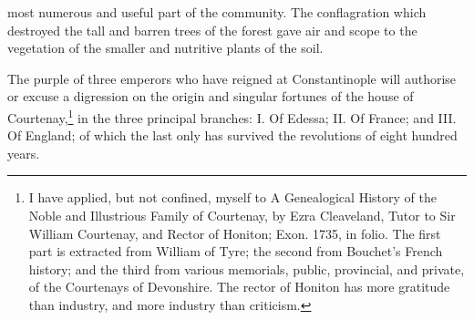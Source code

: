 most numerous and useful part of the community. The conflagration which destroyed the tall and barren trees of the forest gave air and scope to the vegetation of the smaller and nutritive plants of the soil.


The purple of three emperors who have reigned at Constantinople will authorise or excuse a digression on the origin and singular fortunes of the house of Courtenay,\footnote{I have applied, but not confined, myself to A Genealogical History of the Noble and Illustrious Family of Courtenay, by Ezra Cleaveland, Tutor to Sir William Courtenay, and Rector of Honiton; Exon. 1735, in folio. The first part is extracted from William of Tyre; the second from Bouchet\texthebrew{}’s French history; and the third from various memorials, public, provincial, and private, of the Courtenays of Devonshire. The rector of Honiton has more gratitude than industry, and more industry than criticism.} in the three principal branches: I. Of Edessa; II. Of France; and III. Of England; of which the last only has survived the revolutions of eight hundred years.

